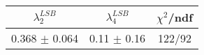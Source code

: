 \begin{tabular}{c|c||c}
$\lambda_{2}^{LSB}$ & $\lambda_4^{LSB}$ & $\chi^{2}$/ndf \\
\hline
0.368 $\pm$ 0.064 & 0.11 $\pm$ 0.16 & 122/92\\
\end{tabular}
